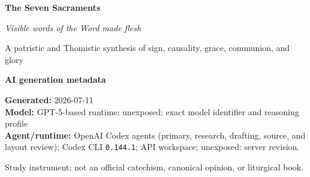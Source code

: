
\usepackage{pdflscape}
\usepackage{ragged2e}

\renewcommand{\sectionguard}{\Needspace*{7\baselineskip}}
\setcounter{tocdepth}{2}

\newcommand{\sacramentMatrixTitle}{Appendix \thesection: The Seven Sacraments}
\newcommand{\sacramentMatrixPageHook}{%
  \refstepcounter{section}%
  \label{app:seven-sacrament-matrix}%
  \addcontentsline{toc}{section}{\protect\numberline{\thesection}The Seven-Sacrament Comparative Matrix}%
}

\newcommand{\churchesInitiationTitle}{Appendix \thesection: The Twenty-Four Catholic Churches and the Order of Initiation}
\newcommand{\churchesInitiationPageHook}{%
  \refstepcounter{section}%
  \label{app:initiation-table}%
  \addcontentsline{toc}{section}{\protect\numberline{\thesection}The Twenty-Four Catholic Churches and the Order of Initiation}%
}

\newcommand{\sacramentLexiconPageHook}{%
  \phantomsection
  \addcontentsline{toc}{section}{Metaphysical and Sacramental Lexicon}%
}



\hypersetup{pageanchor=false}
\begin{titlepage}
\thispagestyle{empty}
\centering
\vspace*{0.18\textheight}
{\Huge\bfseries The Seven Sacraments\par}
\vspace{0.6em}
{\Large\itshape Visible words of the Word made flesh\par}
\vspace{0.5em}
{\large A patristic and Thomistic synthesis of sign, causality, grace, communion, and glory\par}
\vfill
\begin{minipage}{0.82\textwidth}
\footnotesize
\textbf{AI generation metadata}\par\smallskip
\textbf{Generated:} 2026-07-11\\
\textbf{Model:} GPT-5-based runtime; unexposed: exact model identifier and reasoning profile\\
\textbf{Agent/runtime:} OpenAI Codex agents (primary, research, drafting, source, and layout review); Codex CLI \texttt{0.144.1}; API workspace; unexposed: server revision.
\end{minipage}
\vfill
{\small Study instrument; not an official catechism, canonical opinion, or liturgical book.\par}
\end{titlepage}


